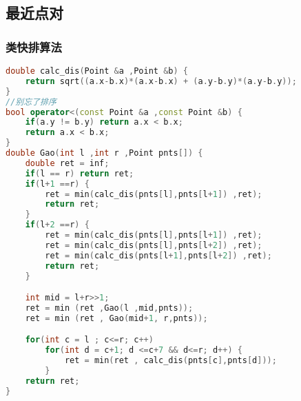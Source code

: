 \subsection{最近点对}
	\subsubsection{类快排算法}
	\begin{lstlisting}[language=c++]
double calc_dis(Point &a ,Point &b) {
	return sqrt((a.x-b.x)*(a.x-b.x) + (a.y-b.y)*(a.y-b.y));
}
//别忘了排序
bool operator<(const Point &a ,const Point &b) {
	if(a.y != b.y) return a.x < b.x;
	return a.x < b.x;
}
double Gao(int l ,int r ,Point pnts[]) {
	double ret = inf;
	if(l == r) return ret;
	if(l+1 ==r) {
		ret = min(calc_dis(pnts[l],pnts[l+1]) ,ret);
		return ret;
	}
	if(l+2 ==r) {
		ret = min(calc_dis(pnts[l],pnts[l+1]) ,ret);
		ret = min(calc_dis(pnts[l],pnts[l+2]) ,ret);
		ret = min(calc_dis(pnts[l+1],pnts[l+2]) ,ret);
		return ret;
	}

	int mid = l+r>>1;
	ret = min (ret ,Gao(l ,mid,pnts));
	ret = min (ret , Gao(mid+1, r,pnts));

	for(int c = l ; c<=r; c++)
		for(int d = c+1; d <=c+7 && d<=r; d++) {
			ret = min(ret , calc_dis(pnts[c],pnts[d]));
		}
	return ret;
}
	\end{lstlisting}

